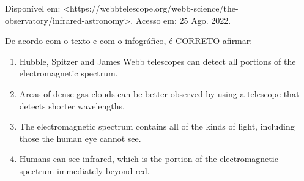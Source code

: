Disponível em: <https://webbtelescope.org/webb-science/the-observatory/infrared-astronomy>. Acesso em: 25 Ago. 2022.

\par\medskip De acordo com o texto e com o infográfico, é CORRETO afirmar:
\begin{enumerate}
\item Hubble, Spitzer and James Webb telescopes can detect all portions of the electromagnetic spectrum.
\item Areas of dense gas clouds can be better observed by using a telescope that detects shorter wavelengths.
\item The electromagnetic spectrum contains all of the kinds of light, including those the human eye cannot see.
\item Humans can see infrared, which is the portion of the electromagnetic spectrum immediately beyond red.
\end{enumerate}
